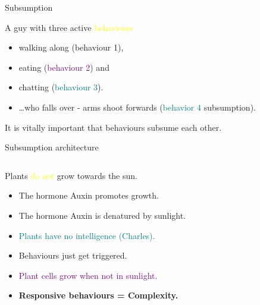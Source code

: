 \documentclass[color=pdftex,usenames,dvipsnames, aspectratio=169]{beamer}
\begin{document}
\begin{frame}{Subsumption}
\begin{block}{A guy with three active \textcolor{yellow}{behaviours}}
\begin{itemize}
\item walking along (\textcolor{OliveGreen}{behaviour 1}),
\item eating (\textcolor{purple}{behaviour 2}) and
\item chatting (\textcolor{teal}{behaviour 3}).
\item \dots who falls over - arms shoot forwards (\textcolor{teal}{behavior 4} \textcolor{BrickRed}{subsumption}).
\end{itemize}

\alert{It is vitally important that behaviours subsume each other.}
\end{block}
\end{frame}

\begin{frame}[fragile]{Subsumption architecture}

\begin{columns}
\begin{column}{0.6\textwidth}
\begin{block}{Plants \textcolor{yellow}{do not} grow towards the sun.}
\begin{itemize}
\item \textcolor{OliveGreen}{The hormone Auxin promotes growth.}
\item \textcolor{BrickRed}{The hormone Auxin is denatured by sunlight.}
\item \textcolor{teal}{Plants have no intelligence (Charles).}
\item \alert{Behaviours} just get triggered.  
\item \textcolor{purple}{Plant cells grow when not in sunlight.}
\item \textbf{Responsive behaviours = Complexity.}
\end{itemize}
\end{block}
\end{column}
\begin{column}{0.4\textwidth}
\begin{center}
\href{http://plantsinmotion.bio.indiana.edu/plantmotion/MovieFiles/CornSunWorship.m4v}{}
\end{center}
\end{column}
\end{columns}
\end{frame}
\end{document}
